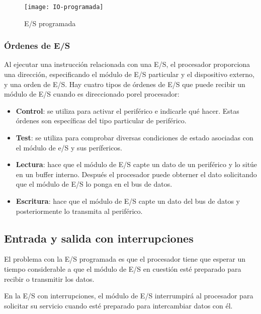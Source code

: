 \begin{figure}[h]
  \centering
  \texttt{[image: IO-programada]}
  \caption{E/S programada}\label{fig:E/S-programada}
\end{figure}

\begin{subs}

  \subsubsection{Órdenes de E/S}
  Al ejecutar una instrucción relacionada con una E/S, el procesador proporciona una dirección, especificando el módulo de E/S particular y el dispositivo externo, y una orden de E/S. Hay cuatro tipos de órdenes de E/S que puede recibir un módulo de E/S cuando es direccionado porel procesador:

  \begin{itemize}
    \item \textbf{Control}: se utiliza para activar el periférico e indicarle qué hacer. Estas órdenes son específicas del tipo particular de periférico.
    \item \textbf{Test}: se utiliza para comprobar diversas condiciones de estado asociadas con el módulo de e/S y sus perífericos.
    \item \textbf{Lectura}: hace que el módulo de E/S capte un dato de un periférico y lo sitúe en un buffer interno. Después el procesador puede obterner el dato solicitando que el módulo de E/S lo ponga en el bus de datos.
    \item \textbf{Escritura}: hace que el módulo de E/S capte un dato del bus de datos y posteriormente lo transmita al periférico.
  \end{itemize}

\end{subs}

\subsection{Entrada y salida con interrupciones}

El problema con la E/S programada es que el procesador tiene que esperar un tiempo considerable a que el módulo de E/S en cuestión esté preparado para recibir o transmitir los datos.

En la E/S con interrupciones, el módulo de E/S interrumpirá al procesador para solicitar su servicio cuando esté preparado para intercambiar datos con él.


